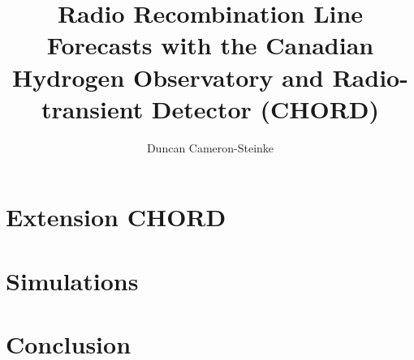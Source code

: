 \documentclass[msc,oneside]{ubcthesis}%
\title{Radio Recombination Line Forecasts with the Canadian Hydrogen Observatory and Radio-transient Detector (CHORD)}
\author{Duncan Cameron-Steinke} %
\begin{document}
% 







\chapter{Extension CHORD}


\chapter{Simulations}


\chapter{Conclusion}




\end{document}
